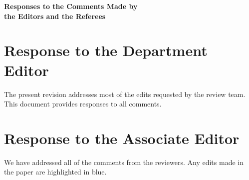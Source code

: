 \documentclass[11pt]{article}
\newcommand{\1}{\ensuremath{\mathbf{1}}} %
\theoremstyle{thm-sf}
\begin{document}
	\begin{center} {\Large {\sffamily\bfseries Responses to the Comments Made by \\
				the Editors and the Referees}}
	\end{center}
	
	\bigskip
	
	\section{Response to the Department Editor}
	
	The present revision addresses most of the edits requested by the review team. This document provides responses to all comments.
	
	\section{Response to the Associate Editor}
	
	We have addressed all of the comments from the reviewers. Any edits made in the paper are highlighted in {\color{blue} blue}. 
	
\end{document}
